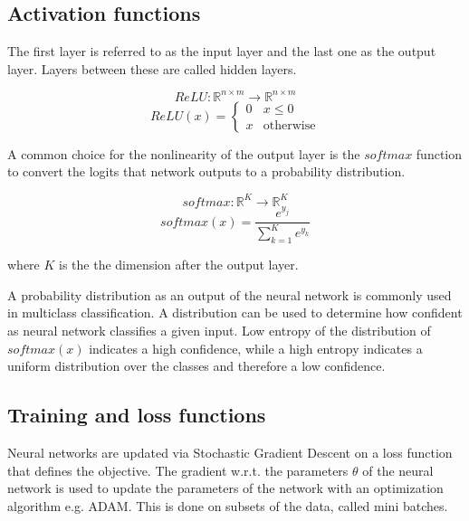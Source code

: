 \documentclass{article}
\begin{document}
\subsection{Activation functions}

\noindent The first layer is referred to as the input layer and the last one as the output layer. Layers between
these are called hidden layers.

\begin{equation}
    ReLU: \mathbb{R}^{n \times m} \xrightarrow{} \mathbb{R}^{n \times m}
\end{equation}
\begin{equation*}
    ReLU(x)=
        \begin{cases}
            0 &x\leq 0 \\
            x&\text{otherwise}
        \end{cases}
\end{equation*}

\noindent A common choice for the nonlinearity of the output layer is the $softmax$ function  to convert the 
logits that network outputs to a probability distribution. 

\begin{equation}
    softmax: \mathbb{R}^K \xrightarrow{} \mathbb{R}^K
\end{equation}
\begin{equation*}
    softmax(x) = \frac{e^{y_j}}{\sum_{k=1}^K e^{y_k}}
\end{equation*}

where $K$ is the the dimension after the output layer.

\noindent A probability distribution as an output of the neural network is commonly used in multiclass classification.
A distribution can be used to determine how confident as neural network classifies a given input.
Low entropy of the distribution of $softmax(x)$ indicates a high confidence, while a high entropy
indicates a uniform distribution over the classes and therefore a low confidence.\\

\subsection{Training and loss functions}
\noindent Neural networks are updated via Stochastic Gradient Descent on a loss function that defines the objective.
The gradient w.r.t. the parameters $\theta$ of the neural network is used to update the parameters of the network with an optimization algorithm e.g. ADAM. This is done on subsets of the data, called mini batches.\\
\end{document}
